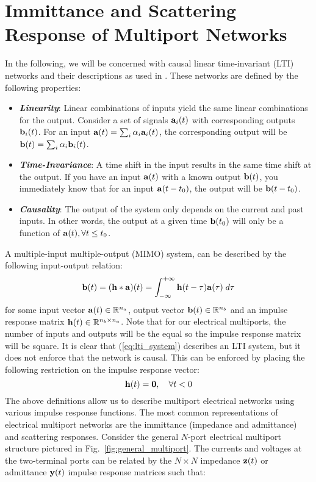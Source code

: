 \section{Immittance and Scattering Response of Multiport Networks}

In the following, we will be concerned with causal linear time-invariant (LTI) networks and their descriptions as used in \cite{passive_macromodeling, newcomb}. These networks are defined by the following properties:
\begin{itemize}
    \item {\bf\textit{Linearity}}: Linear combinations of inputs yield the same linear combinations for the output. Consider a set of signals $\vb{a}_i(t)$ with corresponding outputs $\vb{b}_i(t)$. For an input $\vb{a}(t) = \sum_i \alpha_i \vb{a}_i(t)$, the corresponding output will be $\vb{b}(t) = \sum_i \alpha_i \vb{b}_i(t)$.
    \item {\bf\textit{Time-Invariance}}: A time shift in the input results in the same time shift at the output. If you have an input $\vb{a}(t)$ with a known output $\vb{b}(t)$, you immediately know that for an input $\vb{a}(t-t_0)$, the output will be $\vb{b}(t-t_0)$.
    \item {\bf\textit{Causality}}: The output of the system only depends on the current and past inputs. In other words, the output at a given time $\vb{b}(t_0)$ will only be a function of $\vb{a}(t), \forall t \leq t_0$.
\end{itemize}
A multiple-input multiple-output (MIMO) system, can be described by the following input-output relation:
\begin{equation}\label{eq:lti_system}
    \vb{b}(t) = (\vb{h} \ast \vb{a})(t) = \int_{-\infty}^{+\infty} \vb{h}(t-\tau) \vb{a}(\tau)\; d\tau
\end{equation}
for some input vector $\vb{a}(t) \in \mathbb{R}^{n_a}$, output vector $\vb{b}(t) \in \mathbb{R}^{n_b}$ and an impulse response matrix $\vb{h}(t) \in \mathbb{R}^{n_b \times n_a}$. Note that for our electrical multiports, the number of inputs and outputs will be the equal so the impulse response matrix will be square. It is clear that (\ref{eq:lti_system}) describes an LTI system, but it does not enforce that the network is causal. This can be enforced by placing the following restriction on the impulse response vector:
\begin{equation}
    \vb{h}(t) = \vb{0},\quad \forall t < 0
\end{equation}
The above definitions allow us to describe multiport electrical networks using various impulse response functions. The most common representations of electrical multiport networks are the immittance (impedance and admittance) and scattering responses. Consider the general $N$-port electrical multiport structure pictured in Fig.\ \ref{fig:general_multiport}. The currents and voltages at the two-terminal ports can be related by the $N \times N$ impedance $\vb{z}(t)$ or admittance $\vb{y}(t)$ impulse response matrices such that:
